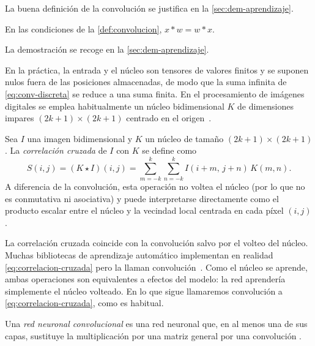 La buena definición de la convolución se justifica en la \cref{sec:dem-aprendizaje}.

\begin{proposicion}\label{prop:conv-conmutativa}
En las condiciones de la \cref{def:convolucion}, $x * w = w * x$.
\end{proposicion}
La demostración se recoge en la \cref{sec:dem-aprendizaje}.

En la práctica, la entrada y el núcleo son tensores de valores finitos y se
suponen nulos fuera de las posiciones almacenadas, de modo que la suma
infinita de \cref{eq:conv-discreta} se reduce a una suma finita. En el procesamiento de imágenes digitales se emplea habitualmente un núcleo bidimensional $K$ de dimensiones impares $(2k+1) \times (2k+1)$ centrado en el origen~\cite{mesejo2026vision}.

\begin{definicion}\label{def:correlacion-cruzada}
Sea $I$ una imagen bidimensional y $K$ un núcleo de tamaño $(2k+1) \times (2k+1)$. La \emph{correlación cruzada} de $I$ con $K$ se define como
\begin{equation}\label{eq:correlacion-cruzada}
  S(i,j) = (K \star I)(i,j) = \sum_{m=-k}^{k}\sum_{n=-k}^{k} I(i+m,\, j+n)\, K(m,n).
\end{equation}
A diferencia de la convolución, esta operación no voltea el núcleo (por lo que no es conmutativa ni asociativa) y puede interpretarse directamente como el producto escalar entre el núcleo y la vecindad local centrada en cada píxel $(i,j)$ \cite{mesejo2026vision}.
\end{definicion}
\begin{observacion}
La correlación cruzada coincide con la convolución salvo por el volteo del
núcleo. Muchas bibliotecas de aprendizaje automático implementan en realidad
\cref{eq:correlacion-cruzada} pero la llaman convolución~\cite[sec.~9.1]{goodfellow2016deep}. Como el núcleo
se aprende, ambas operaciones son equivalentes a efectos del modelo: la red
aprendería simplemente el núcleo volteado. En lo que sigue llamaremos
convolución a \cref{eq:correlacion-cruzada}, como es habitual.
\end{observacion}

\begin{definicion}\label{def:cnn}
Una \emph{red neuronal convolucional} es una red neuronal que, en al menos una
de sus capas, sustituye la multiplicación por una matriz general por una
convolución \cite[cap.~9]{goodfellow2016deep}.
\end{definicion}

